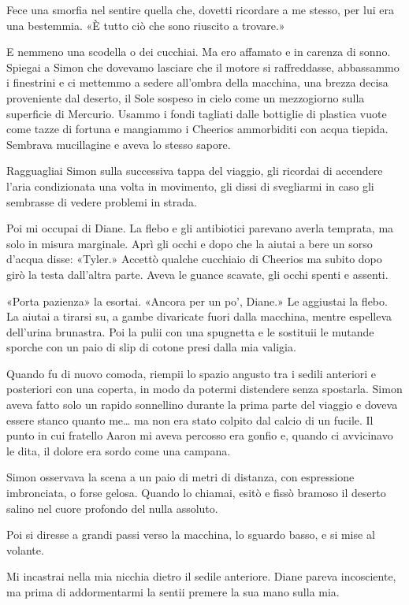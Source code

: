 Fece una smorfia nel sentire quella che, dovetti ricordare a me stesso,
per lui era una bestemmia. «È tutto ciò che sono riuscito a trovare.»

E nemmeno una scodella o dei cucchiai. Ma ero affamato e in carenza di
sonno. Spiegai a Simon che dovevamo lasciare che il motore si
raffreddasse, abbassammo i finestrini e ci mettemmo a sedere all'ombra
della macchina, una brezza decisa proveniente dal deserto, il Sole
sospeso in cielo come un mezzogiorno sulla superficie di Mercurio.
Usammo i fondi tagliati dalle bottiglie di plastica vuote come tazze di
fortuna e mangiammo i Cheerios ammorbiditi con acqua tiepida. Sembrava
mucillagine e aveva lo stesso sapore.

Ragguagliai Simon sulla successiva tappa del viaggio, gli ricordai di
accendere l'aria condizionata una volta in movimento, gli dissi di
svegliarmi in caso gli sembrasse di vedere problemi in strada.

Poi mi occupai di Diane. La flebo e gli antibiotici parevano averla
temprata, ma solo in misura marginale. Aprì gli occhi e dopo che la
aiutai a bere un sorso d'acqua disse: «Tyler.» Accettò qualche cucchiaio
di Cheerios ma subito dopo girò la testa dall'altra parte. Aveva le
guance scavate, gli occhi spenti e assenti.

«Porta pazienza» la esortai. «Ancora per un po', Diane.» Le aggiustai la
flebo. La aiutai a tirarsi su, a gambe divaricate fuori dalla macchina,
mentre espelleva dell'urina brunastra. Poi la pulii con una spugnetta e
le sostituii le mutande sporche con un paio di slip di cotone presi
dalla mia valigia.

Quando fu di nuovo comoda, riempii lo spazio angusto tra i sedili
anteriori e posteriori con una coperta, in modo da potermi distendere
senza spostarla. Simon aveva fatto solo un rapido sonnellino durante la
prima parte del viaggio e doveva essere stanco quanto me\ldots{} ma non
era stato colpito dal calcio di un fucile. Il punto in cui fratello
Aaron mi aveva percosso era gonfio e, quando ci avvicinavo le dita, il
dolore era sordo come una campana.

Simon osservava la scena a un paio di metri di distanza, con espressione
imbronciata, o forse gelosa. Quando lo chiamai, esitò e fissò bramoso il
deserto salino nel cuore profondo del nulla assoluto.

Poi si diresse a grandi passi verso la macchina, lo sguardo basso, e si
mise al volante.

Mi incastrai nella mia nicchia dietro il sedile anteriore. Diane pareva
incosciente, ma prima di addormentarmi la sentii premere la sua mano
sulla mia.

